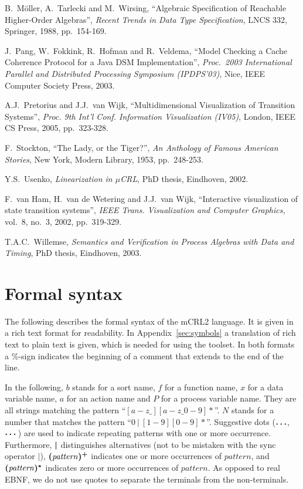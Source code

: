 \documentclass[a4paper,fleqn]{article}
\newcommand{\frm}[1]{\mbox{\ensuremath{#1}}}
\newcommand{\f}[1]{\ensuremath{\mathit{#1}}}
\newcommand{\mb}[1]{\text{\boldmath$#1$}}%
\newcommand{\mCRL}{\frm{\mu}CRL\xspace}
\begin{document}
\begin{thebibliography}{99}
B.\ M\"{o}ller, A.\ Tarlecki and M.\ Wirsing,
``Algebraic Specification of Reachable Higher-Order Algebras'',
\emph{Recent Trends in Data Type Specification},
LNCS 332, Springer, 1988, pp.\ 154-169.

J.\ Pang, W.\ Fokkink, R.\ Hofman and R.\ Veldema, ``Model
Checking a Cache Coherence Protocol for a Java DSM
Implementation'', \emph{Proc.\ 2003 International Parallel and
Distributed Processing Symposium (IPDPS'03)}, Nice, IEEE Computer
Society Press, 2003.

A.J.\ Pretorius and J.J.\ van Wijk,
``Multidimensional Visualization of Transition Systems'',
\emph{Proc. 9th Int'l Conf. Information Visualization (IV05)},
London, IEEE CS Press, 2005, pp.\ 323-328.

F.\ Stockton,
``The Lady, or the Tiger?'',
\emph{An Anthology of Famous American Stories},
New York, Modern Library, 1953, pp.\ 248-253.

Y.S.\ Usenko,
\emph{Linearization in \mCRL},
PhD thesis, Eindhoven, 2002.

F.\ van Ham, H.\ van de Wetering and J.J.\ van Wijk,
``Interactive visualization of state transition systems'',
\emph{IEEE Trans. Visualization and Computer Graphics,}
vol.\ 8, no.\ 3, 2002, pp.\ 319-329.

T.A.C.\ Willemse,
\emph{Semantics and Verification in Process Algebras with Data and Timing},
PhD thesis, Eindhoven, 2003.

\end{thebibliography}

\newpage
\appendix

\section{Formal syntax}
\label{sec:syntax}

The following describes the formal syntax of the mCRL2 language. It is given
in a rich text format for readability. In Appendix~\ref{sec:symbols} a
translation of rich text to plain text is given, which is needed for
using the toolset. In both formats a $\%$-sign indicates the beginning of a
comment that extends to the end of the line.

In the following, $b$ stands for a sort name, $f$ for a function name, $x$ for
a data variable name, $a$ for an action name and $P$ for a process variable
name. They are all strings matching the pattern ``$[a{-}z\_][a{-}z\_0{-}9]*$''.
$N$ stands for a number that matches the pattern ``$0\ |\ [1-9][0-9]*$''.
Suggestive dots ($\mb{\ldots}$, $\mb{\cdots}$) are used to indicate repeating patterns with one or
more occurrence. Furthermore, $\mb{|}$ distinguishes alternatives (not to be mistaken
with the sync operator $|$), $\mb{(}\f{pattern}\mb{)^{+}}$ indicates one or more
occurrences of $\f{pattern}$, and $\mb{(}\f{pattern}\mb{)^{*}}$ indicates zero or more
occurrences of $\f{pattern}$. As opposed to real EBNF, we do not use quotes to
separate the terminals from the non-terminals.
\end{document}
